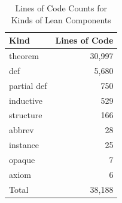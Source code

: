 \begin{table}
  \centering
  \small
  \caption{Lines of Code Counts for Kinds of Lean Components}
  \label{tab:loc-by-kind}
\begin{tabular}{lr}
\toprule
Kind & Lines of Code \\
\midrule
theorem             & 30{,}997 \\
def                 &  5{,}680 \\
partial def         &     750  \\
inductive           &     529  \\
structure           &     166  \\
abbrev              &      28  \\
instance            &      25  \\
opaque              &       7  \\
axiom               &       6  \\
\midrule
Total               & 38{,}188 \\
\bottomrule
\end{tabular}
\end{table}
